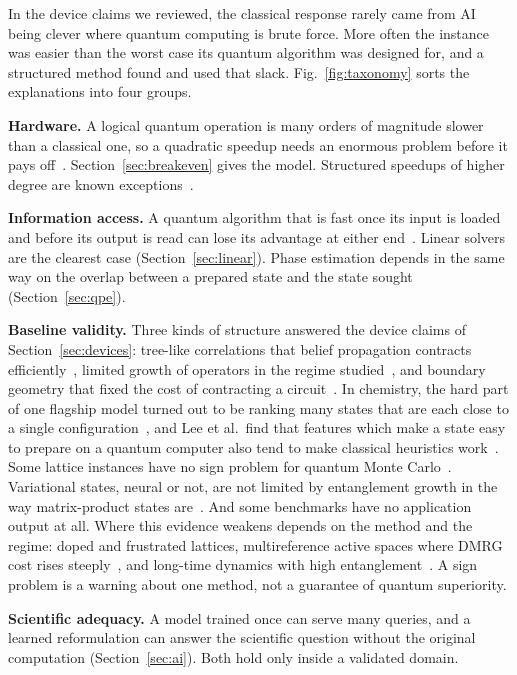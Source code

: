 \documentclass[10pt,a4paper]{article}
\begin{document}
In the device claims we reviewed, the classical response rarely came from AI being clever where quantum computing is brute force. More often the instance was easier than the worst case its quantum algorithm was designed for, and a structured method found and used that slack. Fig.~\ref{fig:taxonomy} sorts the explanations into four groups.

\textbf{Hardware.} A logical quantum operation is many orders of magnitude slower than a classical one, so a quadratic speedup needs an enormous problem before it pays off~\cite{hoefler2023,babbush2021}. Section~\ref{sec:breakeven} gives the model. Structured speedups of higher degree are known exceptions~\cite{babbush2025}.

\textbf{Information access.} A quantum algorithm that is fast once its input is loaded and before its output is read can lose its advantage at either end~\cite{aaronson2015,hoefler2023}. Linear solvers are the clearest case (Section~\ref{sec:linear}). Phase estimation depends in the same way on the overlap between a prepared state and the state sought (Section~\ref{sec:qpe}).

\textbf{Baseline validity.} Three kinds of structure answered the device claims of Section~\ref{sec:devices}: tree-like correlations that belief propagation contracts efficiently~\cite{tindall2024}, limited growth of operators in the regime studied~\cite{begusic2024}, and boundary geometry that fixed the cost of contracting a circuit~\cite{manabe2026}. In chemistry, the hard part of one flagship model turned out to be ranking many states that are each close to a single configuration~\cite{zhai2026}, and Lee et al.\ find that features which make a state easy to prepare on a quantum computer also tend to make classical heuristics work~\cite{lee2023}. Some lattice instances have no sign problem for quantum Monte Carlo~\cite{hirsch1985}. Variational states, neural or not, are not limited by entanglement growth in the way matrix-product states are~\cite{mauron2025}. And some benchmarks have no application output at all. Where this evidence weakens depends on the method and the regime: doped and frustrated lattices, multireference active spaces where DMRG cost rises steeply~\cite{goings2022}, and long-time dynamics with high entanglement~\cite{bermejo2026}. A sign problem is a warning about one method, not a guarantee of quantum superiority.

\textbf{Scientific adequacy.} A model trained once can serve many queries, and a learned reformulation can answer the scientific question without the original computation (Section~\ref{sec:ai}). Both hold only inside a validated domain.
\end{document}
